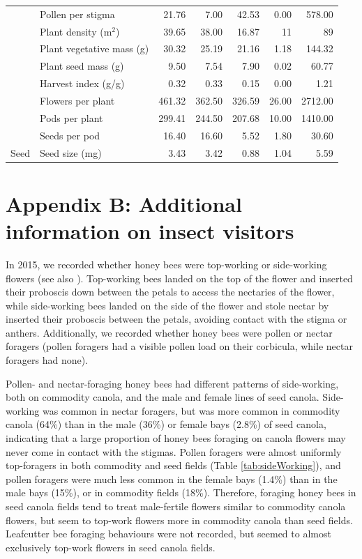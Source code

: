 \documentclass[12pt]{article} %
\begin{document}
\begin{table}[h]
\begin{tabular}{l|l|r|r|r|r|r}
\cline{2-7}
 & Pollen per stigma & 21.76 & 7.00 & 42.53 & 0.00 & 578.00\\
\cline{2-7}
 & Plant density (m$^2$) & 39.65 & 38.00 & 16.87 & 11 & 89\\
\cline{2-7}
 & Plant vegetative mass (g) & 30.32 & 25.19 & 21.16 & 1.18 & 144.32\\
\cline{2-7}
 & Plant seed mass (g) & 9.50 & 7.54 & 7.90 & 0.02 & 60.77\\
\cline{2-7}
 & Harvest index (g/g) & 0.32 & 0.33 & 0.15 & 0.00 & 1.21\\
\cline{2-7}
 & Flowers per plant & 461.32 & 362.50 & 326.59 & 26.00 & 2712.00\\
\cline{2-7}
 & Pods per plant & 299.41 & 244.50 & 207.68 & 10.00 & 1410.00\\
\cline{2-7}
 & Seeds per pod & 16.40 & 16.60 & 5.52 & 1.80 & 30.60\\
\cline{2-7}
\multirow{-15}{*}{\raggedright\arraybackslash Seed} & Seed size (mg) & 3.43 & 3.42 & 0.88 & 1.04 & 5.59\\
\hline
\end{tabular}
\end{table}

\clearpage

\section*{Appendix B: Additional information on insect visitors}

In 2015, we recorded whether honey bees were top-working or side-working flowers (see also \citealp{free1973, free1983, mohr1988}).
Top-working bees landed on the top of the flower and inserted their proboscis down between the petals to access the nectaries of the flower, while side-working bees landed on the side of the flower and stole nectar by inserted their proboscis between the petals, avoiding contact with the stigma or anthers. 
Additionally, we recorded whether honey bees were pollen or nectar foragers (pollen foragers had a visible pollen load on their corbicula, while nectar foragers had none).

Pollen- and nectar-foraging honey bees had different patterns of side-working, both on commodity canola, and the male and female lines of seed canola.
Side-working was common in nectar foragers, but was more common in commodity canola (64\%) than in the male (36\%) or female bays (2.8\%) of seed canola, indicating that a large proportion of honey bees foraging on canola flowers may never come in contact with the stigmas.
Pollen foragers were almost uniformly top-foragers in both commodity and seed fields (Table \ref{tab:sideWorking}), and pollen foragers were much less common in the female bays (1.4\%) than in the male bays (15\%), or in commodity fields (18\%).
Therefore, foraging honey bees in seed canola fields tend to treat male-fertile flowers similar to commodity canola flowers, but seem to top-work flowers more in commodity canola than seed fields.
Leafcutter bee foraging behaviours were not recorded, but seemed to almost exclusively top-work flowers in seed canola fields.
\end{document}
